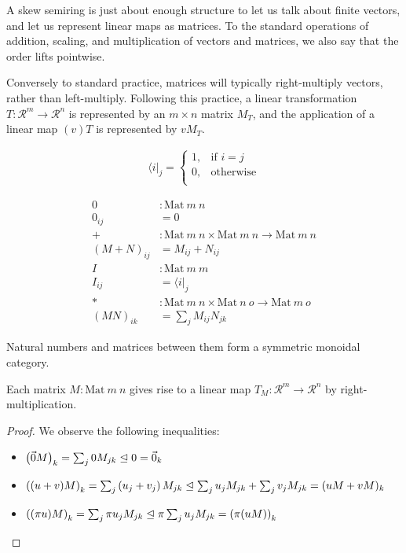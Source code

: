 \documentclass[submission,copyright,creativecommons]{eptcs}
\begin{document}
A skew semiring is just about enough structure to let us talk about finite
vectors, and let us represent linear maps as matrices.
To the standard operations of addition, scaling, and multiplication of vectors
and matrices, we also say that the order lifts pointwise.

Conversely to standard practice, matrices will typically right-multiply vectors,
rather than left-multiply.
Following this practice, a linear transformation
$T : \mathscr R^m \to \mathscr R^n$ is represented by an $m \times n$ matrix
$M_T$, and the application of a linear map $(v)T$ is represented by $vM_T$.

\begin{definition}
  \begin{align*}
    \langle i \rvert_j =
    \begin{cases}
      1, & \textrm{if }i = j \\
      0, & \textrm{otherwise} \\
    \end{cases}
  \end{align*}
\end{definition}

\begin{definition}
    \begin{align*}
      0 &: \mathrm{Mat}~m~n \\
      0_{ij} &= 0 \\
      + &: \mathrm{Mat}~m~n \times \mathrm{Mat}~m~n \to \mathrm{Mat}~m~n \\
      (M + N)_{ij} &= M_{ij} + N_{ij} \\
      I &: \mathrm{Mat}~m~m \\
      I_{ij} &= \langle i \rvert_j \\
      * &: \mathrm{Mat}~m~n \times \mathrm{Mat}~n~o \to \mathrm{Mat}~m~o \\
      (MN)_{ik} &= \sum_j M_{ij}N_{jk}
    \end{align*}
\end{definition}

\begin{lemma}
  Natural numbers and matrices between them form a symmetric monoidal category.
\end{lemma}

\begin{lemma}
  Each matrix $M : \mathrm{Mat}~m~n$ gives rise to a linear map
  $T_M : \mathscr R^m \to \mathscr R^n$ by right-multiplication.
\end{lemma}
\begin{proof}
  We observe the following inequalities:
  \begin{itemize}
  \item $\left(\vec 0M\right)_{k} = \sum_j 0M_{jk} \trianglelefteq 0 = \vec 0_{k}$
  \item $\left((u + v)M\right)_{k} = \sum_j \left(u_j + v_j\right)M_{jk} \trianglelefteq
    \sum_j u_jM_{jk} + \sum_j v_jM_{jk} = (uM + vM)_{k}$
  \item $\left((\pi u)M\right)_{k} = \sum_j \pi u_jM_{jk} \trianglelefteq
    \pi\sum_j u_jM_{jk} = \left(\pi(uM)\right)_{k}$
  \end{itemize}
\end{proof}
\end{document}

